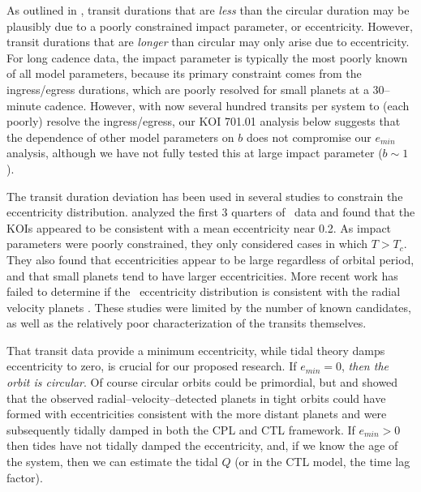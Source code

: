 As outlined in \cite{2008ApJ...678.1407F}, transit durations that are
{\it less} than the circular duration may be plausibly due to a poorly
constrained impact parameter, or eccentricity.  However, transit
durations that are {\it longer} than circular may only arise due to
eccentricity.  For long cadence \kepler data, the impact parameter is
typically the most poorly known of all model parameters, because its
primary constraint comes from the ingress/egress durations, which are
poorly resolved for small planets at a 30--minute cadence.  However,
with now several hundred transits per system to (each poorly) resolve
the ingress/egress, our KOI 701.01 analysis below suggests that the
dependence of other model parameters on $b$ does not compromise our
$e_{min}$ analysis, although we have not fully tested this at large
impact parameter ($b \sim 1$).

The transit duration deviation has been used in several studies to
constrain the eccentricity distribution. \cite{Moorhead11} analyzed
the first 3 quarters of \kepler~data and found that the KOIs appeared
to be consistent with a mean eccentricity near 0.2. As impact
parameters were poorly constrained, they only considered cases in
which $T > T_c$. They also found that eccentricities appear to be
large regardless of orbital period, and that small planets tend to
have larger eccentricities. More recent work has failed to determine
if the \kepler~eccentricity distribution is consistent with the radial
velocity planets \citep{Plavchan12,Kane12}. These studies were limited
by the number of known candidates, as well as the relatively poor
characterization of the transits themselves.

\medskip
{\centerline{}}
\smallskip

That transit data provide a minimum eccentricity, while tidal theory
damps eccentricity to zero, is crucial for our proposed research. If
$e_{min} = 0$, \textit{then the orbit is circular}.  Of course
circular orbits could be primordial, but \cite{Jackson08}
and \cite{Matsumura10} showed that the observed
radial--velocity--detected planets in tight orbits could have formed
with eccentricities consistent with the more distant planets and were
subsequently tidally damped in both the CPL and CTL framework.  If
$e_{min} > 0$ then tides have not tidally damped the eccentricity,
and, if we know the age of the system, then we can estimate the tidal
$Q$ (or in the CTL model, the time lag factor).

